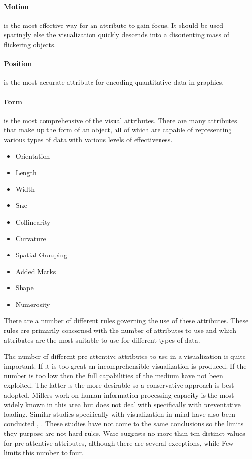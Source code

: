 \documentclass[a4paper, 11pt, titlepage, onehalfspacing]{report}
\begin{document}
\paragraph{Motion}is the most effective way for an attribute to gain focus. It should be used sparingly else the visualization quickly descends into a disorienting mass of flickering objects.

\paragraph{Position}is the most accurate attribute for encoding quantitative data in graphics.

\paragraph{Form} is the most comprehensive of the visual attributes. There are many attributes that make up the form of an object, all of which are capable of representing various types of data with various levels of effectiveness. 
\begin{itemize}
\item Orientation
\item Length
\item Width
\item Size
\item Collinearity
\item Curvature
\item Spatial Grouping
\item Added Marks
\item Shape
\item Numerosity
\end{itemize}


There are a number of different rules governing the use of these attributes. These rules are primarily concerned with the number of attributes to use and which attributes are the most suitable to use for different types of data.

The number of different pre-attentive attributes to use in a visualization is quite important. If it is too great an incomprehensible visualization is produced. If the number is too low then the full capabilities of the medium have not been exploited. The latter is the more desirable so a conservative approach is best adopted. Millers work on human information processing capacity \cite{Mil56} is the most widely known in this area but does not deal with specifically with preventative loading. Similar studies specifically with visualization in mind have also been conducted \cite{few2004show}, \cite{ware2012information}. These studies have not come to the same conclusions so the limits they purpose are not hard rules. Ware suggests no more than ten distinct values for pre-attentive attributes, although there are several exceptions, while Few limits this number to four.
\end{document}
